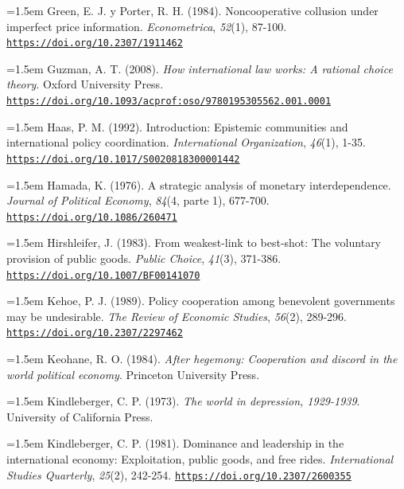 \documentclass[10pt,a4paper]{article}
\begin{document}
\noindent\hangindent=1.5em Green, E. J. y Porter, R. H. (1984). Noncooperative collusion under imperfect price information. \textit{Econometrica}, \textit{52}(1), 87-100. \href{https://doi.org/10.2307/1911462}{\nolinkurl{https://doi.org/10.2307/1911462}}

\noindent\hangindent=1.5em Guzman, A. T. (2008). \textit{How international law works: A rational choice theory}. Oxford University Press. \href{https://doi.org/10.1093/acprof:oso/9780195305562.001.0001}{\nolinkurl{https://doi.org/10.1093/acprof:oso/9780195305562.001.0001}}

\noindent\hangindent=1.5em Haas, P. M. (1992). Introduction: Epistemic communities and international policy coordination. \textit{International Organization}, \textit{46}(1), 1-35. \href{https://doi.org/10.1017/S0020818300001442}{\nolinkurl{https://doi.org/10.1017/S0020818300001442}}

\noindent\hangindent=1.5em Hamada, K. (1976). A strategic analysis of monetary interdependence. \textit{Journal of Political Economy}, \textit{84}(4, parte 1), 677-700. \href{https://doi.org/10.1086/260471}{\nolinkurl{https://doi.org/10.1086/260471}}

\noindent\hangindent=1.5em Hirshleifer, J. (1983). From weakest-link to best-shot: The voluntary provision of public goods. \textit{Public Choice}, \textit{41}(3), 371-386. \href{https://doi.org/10.1007/BF00141070}{\nolinkurl{https://doi.org/10.1007/BF00141070}}

\noindent\hangindent=1.5em Kehoe, P. J. (1989). Policy cooperation among benevolent governments may be undesirable. \textit{The Review of Economic Studies}, \textit{56}(2), 289-296. \href{https://doi.org/10.2307/2297462}{\nolinkurl{https://doi.org/10.2307/2297462}}

\noindent\hangindent=1.5em Keohane, R. O. (1984). \textit{After hegemony: Cooperation and discord in the world political economy}. Princeton University Press.

\noindent\hangindent=1.5em Kindleberger, C. P. (1973). \textit{The world in depression, 1929-1939}. University of California Press.

\noindent\hangindent=1.5em Kindleberger, C. P. (1981). Dominance and leadership in the international economy: Exploitation, public goods, and free rides. \textit{International Studies Quarterly}, \textit{25}(2), 242-254. \href{https://doi.org/10.2307/2600355}{\nolinkurl{https://doi.org/10.2307/2600355}}
\end{document}
